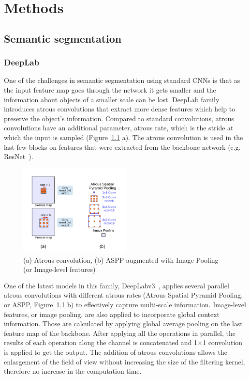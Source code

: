 \chapter{Methods}
\section{Semantic segmentation}
\subsection{DeepLab}
One of the challenges in semantic segmentation using standard CNNs is that as the input feature map goes through the network
it gets smaller and the information about objects of a smaller scale can be lost.
DeepLab family introduces atrous convolutions that extract more dense features
which help to preserve the object's information. Compared to standard convolutions, atrous convolutions have an additional parameter, atrous
rate, which is the stride at which the input is sampled (Figure~\ref*{fig:aconv} a).
The atrous convolution is used in the last few blocks on features that were extracted from the backbone network (e.g. ResNet~\cite{he2016deep}).

\begin{figure}
  \centering
  \includegraphics[width=0.5\textwidth]{figures/conv_aspp.png} %
  \caption{(a) Atrous convolution, (b) ASPP augmented with Image Pooling (or Image-level features) ~\cite{chen2017rethinking}} %
  \label{fig:aconv} %
\end{figure}
One of the latest models in this family, DeepLabv3~\cite{chen2017rethinking}, applies several parallel atrous convolutions with different atrous rates
(Atrous Spatial Pyramid Pooling, or ASPP, Figure~\ref*{fig:aconv} b) to effectively capture multi-scale information. 
Image-level features, or image pooling, are also applied to incorporate global context information. Those are calculated by applying global average pooling on the last feature map of the backbone.
After applying all the operations in parallel, the results of each operation along the channel is concatenated and 1$\times$1 convolution is applied to get the output.
The addition of atrous convolutions allows the enlargement of the field of view without
increasing the size of the filtering kernel, therefore no increase in the computation time.
